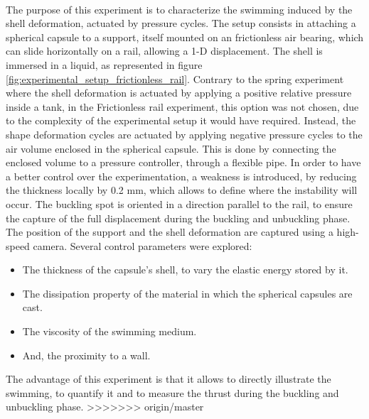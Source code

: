 \paragraph{}
The purpose of this experiment is to characterize the swimming induced by the shell deformation, actuated by pressure cycles. The setup consists in attaching a spherical capsule to a support, itself mounted on an frictionless air bearing, which can slide horizontally on a rail, allowing a 1-D displacement. The shell is immersed in a liquid, as represented in figure \ref{fig:experimental_setup_frictionless_rail}. Contrary to the spring experiment where the shell deformation is actuated by applying a positive relative pressure inside a tank, in the Frictionless rail experiment, this option was not chosen, due to the complexity of the experimental setup it would have required. Instead, the shape deformation cycles are actuated by applying negative pressure cycles to the air volume enclosed in the spherical capsule. This is done by connecting the enclosed volume to a pressure controller, through a flexible pipe. In order to have a better control over the experimentation, a weakness is introduced, by reducing the thickness locally by 0.2 mm, which allows to define where the instability will occur. The buckling spot is oriented in a direction parallel to the rail, to ensure the capture of the full displacement during the buckling and unbuckling phase. The position of the support and the shell deformation are captured using a high-speed camera. Several control parameters were explored:
\begin{itemize}
	\item The thickness of the capsule's shell, to vary the elastic energy stored by it.
	\item The dissipation property of the material in which the spherical capsules are cast.
	\item The viscosity of the swimming medium.
	\item And, the proximity to a wall.
\end{itemize}
The advantage of this experiment is that it allows to directly illustrate the swimming, to quantify it and to measure the thrust during the buckling and unbuckling phase.
>>>>>>> origin/master
